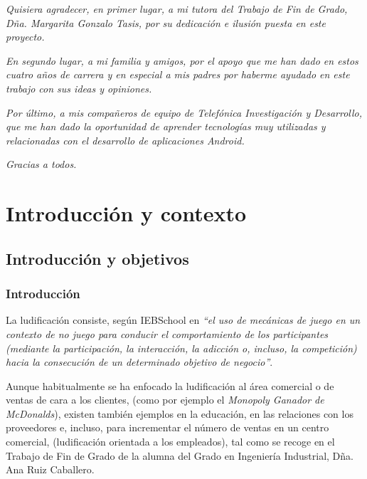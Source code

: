 \documentclass[twoside]{report}
\begin{document}
\begin{flushright}
\textit{Quisiera agradecer, en primer lugar, a mi tutora del Trabajo de Fin de Grado, Dña. Margarita Gonzalo Tasis, por su dedicación e ilusión puesta en este proyecto.} \vspace{0.5cm}

\textit{En segundo lugar, a mi familia y amigos, por el apoyo que me han dado en estos cuatro años de carrera y en especial a mis padres por haberme ayudado en este trabajo con sus ideas y opiniones.} \vspace{0.5cm}

\textit{Por último, a mis compañeros de equipo de Telefónica Investigación y Desarrollo, que me han dado la oportunidad de aprender tecnologías muy utilizadas y relacionadas con el desarrollo de aplicaciones \textit{Android}.} \vspace{0.5cm}

\textit{Gracias a todos.}
\end{flushright}

\newpage
\thispagestyle{empty}
\mbox{}

\clearpage

\tableofcontents

\listoffigures
 
\listoftables

\clearpage



\chapter{Introducción y contexto}
\section{Introducción y objetivos}

\subsection{Introducción}

La ludificación consiste, según IEBSchool \cite{iebschoolGami} en \textit{“el uso de mecánicas de juego en un contexto de no juego para conducir el comportamiento de los participantes (mediante la participación, la interacción, la adicción o, incluso, la competición) hacia la consecución de un determinado objetivo de negocio”}. 

Aunque habitualmente se ha enfocado la ludificación al área comercial o de ventas de cara a los clientes, (como por ejemplo el \cite{monopolymcdo} \textit{Monopoly Ganador de McDonalds}), existen también ejemplos en la educación, en las relaciones con los proveedores e, incluso, para incrementar el número de ventas en un centro comercial, (ludificación orientada a los empleados), tal como se recoge en el Trabajo de Fin de Grado de la alumna del Grado en Ingeniería Industrial, \cite{anatfg} Dña. Ana Ruiz Caballero.
\end{document}
